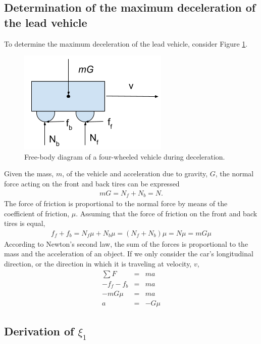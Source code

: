 \documentclass[conference]{IEEEtran}
\begin{document}
\onecolumn
\begin{appendix}

\subsection{Determination of the maximum deceleration of the lead vehicle}
To determine the maximum deceleration of the lead vehicle, consider Figure \ref{fig3}.

\begin{figure}[htbp]
\centerline{\includegraphics[width=2.00 in]{maxDecel.PNG}}
\caption{Free-body diagram of a four-wheeled vehicle during deceleration.}
\label{fig3}
\end{figure}

Given the mass, $m$, of the vehicle and acceleration due to gravity, $G$, the normal force acting on the front and back tires can be expressed
\begin{eqnarray*}
mG=N_f+N_b=N.
\end{eqnarray*}
The force of friction is proportional to the normal force by means of the coefficient of friction, $\mu$. Assuming that the force of friction on the front and back tires is equal,
\begin{eqnarray*}
f_f+f_b=N_f\mu+N_b\mu=(N_f+N_b)\mu=N\mu=mG\mu
\end{eqnarray*}
According to Newton's second law, the sum of the forces is proportional to the mass and the acceleration of an object. If we only consider the car's longitudinal direction, or the direction in which it is traveling at velocity, $v$,
\begin{eqnarray*}
\sum F &=& ma \\
-f_f-f_b &=& ma \\
-mG\mu &=& ma \\
a &=& -G\mu
\end{eqnarray*}




\subsection{Derivation of $\xi_1$}


\end{appendix}
\end{document}
